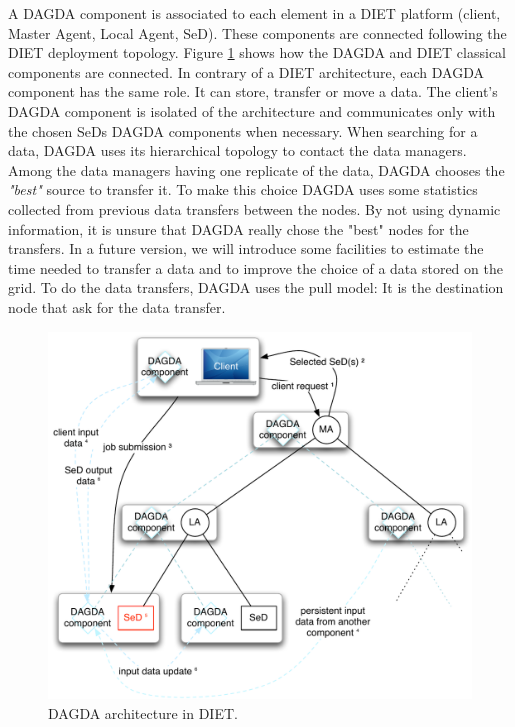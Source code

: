 A DAGDA component is associated to each element in a DIET platform
(client, Master Agent, Local Agent, SeD). These components are connected
following the DIET deployment topology. Figure \ref{fig:DAGDAarch} shows how
the DAGDA and DIET classical components are connected. In contrary of a DIET
architecture, each DAGDA component has the same role. It can store, transfer
or move a data. The client's DAGDA component is isolated of the architecture and
communicates only with the chosen SeDs DAGDA components when necessary. When
searching for a data, DAGDA uses its hierarchical topology to contact the
data managers. Among the data managers having one replicate of the data,
DAGDA chooses the \textit{"best"} source to transfer it. To make this choice
DAGDA uses some statistics collected from previous data transfers between
the nodes. By not using dynamic information, it is unsure that DAGDA really
chose the "best" nodes for the transfers. In a future version, we will
introduce some facilities to estimate the time needed to transfer a data and
to improve the choice of a data stored on the grid. To do the data transfers,
DAGDA uses the pull model: It is the destination node that ask for the data
transfer.
\begin{figure}[h]
\centerline{\includegraphics[width=0.7\linewidth]{fig/dagdaArch}}
\caption{DAGDA architecture in DIET.\label{fig:DAGDAarch}}
\end{figure}

